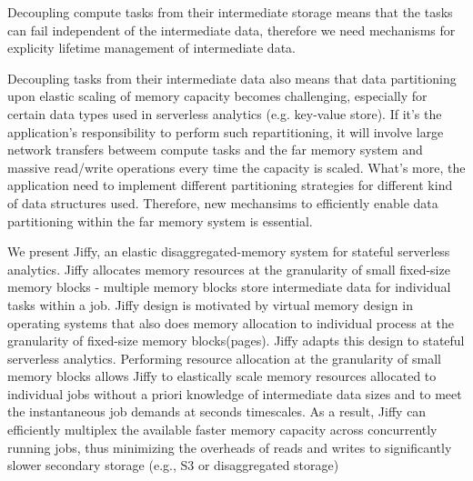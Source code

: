 Decoupling compute tasks from their intermediate storage means that the tasks can fail independent of the intermediate data, therefore we need mechanisms for explicity lifetime management of intermediate data.

Decoupling tasks from their intermediate data also means that data partitioning upon elastic scaling of memory capacity becomes challenging, especially for certain data types used in serverless analytics (e.g. key-value store). If it's the application's responsibility to perform such repartitioning, it will involve large network transfers betweem compute tasks and the far memory system and massive read/write operations every time the capacity is scaled. What's more, the application need to implement different partitioning strategies for different kind of data structures used. Therefore, new mechansims to efficiently enable data partitioning within the far memory system is essential.


We present Jiffy, an elastic disaggregated-memory system for stateful serverless analytics. Jiffy allocates memory resources at the granularity of small fixed-size memory blocks - multiple memory blocks store intermediate data for individual tasks within a job. Jiffy design is motivated by virtual memory design in operating systems that also does memory allocation to individual process at the granularity of fixed-size memory blocks(pages). Jiffy adapts this design to stateful serverless analytics. Performing resource allocation at the granularity of small memory blocks allows Jiffy to elastically scale memory resources allocated to individual jobs without a priori knowledge of intermediate data sizes and to meet the instantaneous job demands at seconds timescales. As a result, Jiffy can efficiently multiplex the available faster memory capacity across concurrently running jobs, thus minimizing the overheads of reads and writes to significantly slower secondary storage (e.g., S3 or disaggregated storage)

